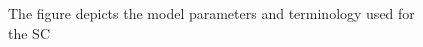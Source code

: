 
\begin{figure}[!h]
  \vspace{-0.2cm}
  \centering
   {}
  \caption{The figure depicts the model parameters and terminology used for the SC}
  \label{fig:nomenclature}
  \vspace{-0.1cm}
\end{figure}

